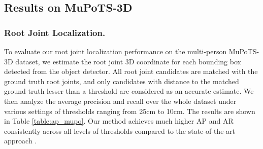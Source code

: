\documentclass[runningheads]{llncs}
\begin{document}
\subsection{Results on MuPoTS-3D}

\subsubsection{Root Joint Localization.}
To evaluate our root joint localization performance on the multi-person MuPoTS-3D dataset, we estimate the root joint 3D coordinate for each bounding box detected from the object detector. All root joint candidates are matched with the ground truth root joints, and only candidates with distance to the matched ground truth lesser than a threshold are considered as an accurate estimate. We then analyze the average precision and recall over the whole dataset under various settings of thresholds ranging from 25cm to 10cm. The results are shown in Table \ref{table:ap_mupo}. Our method achieves much higher AP and AR consistently across all levels of thresholds compared to the state-of-the-art approach \cite{Moon_2019_ICCV_3DMPPE}.
\end{document}
